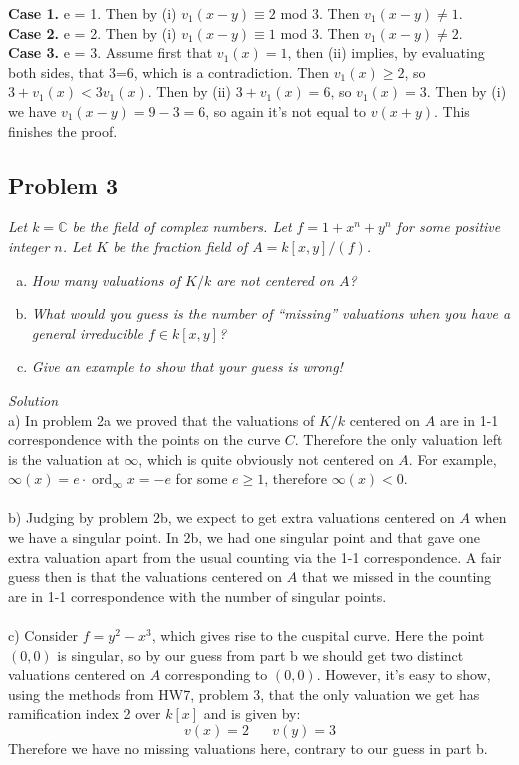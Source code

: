 \documentclass[12 pt]{article}
\newcommand{\C}{\mathbb{C}}
\DeclareMathOperator{\ord}{ord}
\begin{document}
\textbf{Case 1.} e = 1. Then by (i) $v_1(x-y) \equiv 2$ mod $3$. Then $v_1(x-y) \neq 1$.
\\
\textbf{Case 2.} e = 2. Then by (i) $v_1(x-y) \equiv 1$ mod $3$. Then $v_1(x-y) \neq 2$.
\\
\textbf{Case 3.} e = 3. Assume first that $v_1(x) = 1$, then (ii) implies, by evaluating both sides, that 3=6, which is a contradiction. Then $v_1(x)\geq 2$, so $3 + v_1(x) < 3 v_1(x)$. Then by (ii) $3+ v_1(x) = 6$, so $v_1(x) = 3$. Then by (i) we have $v_1(x-y) = 9-3 = 6$, so again it's not equal to $v(x+y)$. This finishes the proof.


\subsection*{Problem 3}
\emph{Let $k = \C$ be the field of complex numbers. Let $f = 1 + x^n + y^n$ for some positive integer $n$. Let $K$ be the fraction field of $A = k[x, y]/(f)$.}
\begin{enumerate} [(a)]
\item \emph{How many valuations of $K/k$ are not centered on $A$?}
\item \emph{What would you guess is the number of ``missing'' valuations when you have a general irreducible $f \in k[x, y]$?}
\item \emph{Give an example to show that your guess is wrong!}
\end{enumerate}
\vspace{5mm}
\emph{Solution}
\\
a) In problem 2a we proved that the valuations of $K/k$ centered on $A$ are in 1-1 correspondence with the points on the curve $C$. Therefore the only valuation left is the valuation at $\infty$, which is quite obviously not centered on $A$. For example, $\infty(x) = e \cdot \ord_{\infty} x = -e$ for some $e\geq 1$, therefore $\infty(x) <0$.
\\
\\
b) Judging by problem 2b, we expect to get extra valuations centered on $A$ when we have a singular point. In 2b, we had one singular point and that gave one extra valuation apart from the usual counting via the 1-1 correspondence. A fair guess then is that the valuations centered on $A$ that we missed in the counting are in 1-1 correspondence with the number of singular points.
\\
\\
c) Consider $f = y^2 - x^3 $, which gives rise to the cuspital curve. Here the point $(0,0)$ is singular, so by our guess from part b we should get two distinct valuations centered on $A$ corresponding to $(0,0)$. However, it's easy to show, using the methods from HW7, problem 3, that the only valuation we get has ramification index 2 over $k[x]$ and is given by:
\[     v(x) = 2 \;\;\;\;\;\; v(y) = 3      \]
Therefore we have no missing valuations here, contrary to our guess in part b.
\end{document}
